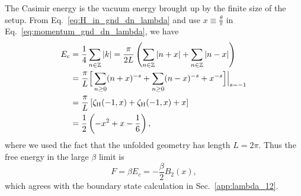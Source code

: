 The Casimir energy is the vacuum energy brought up by the finite size of the setup. From Eq.~\eqref{eq:H_in_gnd_dn_lambda} and use $x\equiv \frac{\theta}{\pi}$ in Eq.~\eqref{eq:momentum_gnd_dn_lambda}, we have
\begin{equation}
\begin{aligned}
E_c &= \frac{1}{4} \sum_{n \in \mathbb{Z}} | k| = \frac{\pi}{2L} \left( \sum_{n \in \mathbb{Z}}  | n + x | + \sum_{n \in \mathbb{Z}}  | n - x |  \right) \\  
&= \frac{\pi}{L} \Big[\sum_{n \ge 0 } ( n + x )^{-s} + \sum_{n \ge 0 }  ( n - x)^{-s}  +   x^{-s} \Big]\Big|_{s = -1} \\
&= \frac{\pi}{L} \left[ \zeta_{\rm H}( -1, x ) + \zeta_{\rm H}( -1, x ) +  x \right] \\
&= \frac{1}{2} \left( - x^2 + x - \frac{1}{6}\right),
\end{aligned}
\end{equation}
where we used the fact that the unfolded geometry has length $L=2\pi$. Thus the free energy in the large $\beta$ limit is
\begin{equation}
F = \beta E_c = - \frac{\beta}{2} B_2( x) ,
\end{equation}
which agrees with the boundary state calculation in Sec.~\ref{app:lambda_12}. 

